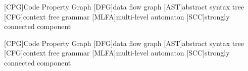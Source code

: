  
[CPG]{Code Property Graph}
[DFG]{data flow graph}
[AST]{abstract syntax tree}
[CFG]{context free grammar}
[MLFA]{multi-level automaton}
[SCC]{strongly connected component}

[CPG]{Code Property Graph}
[DFG]{data flow graph}
[AST]{abstract syntax tree}
[CFG]{context free grammar}
[MLFA]{multi-level automaton}
[SCC]{strongly connected component}
